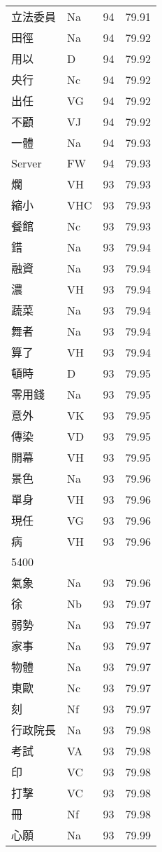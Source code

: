 \documentclass[twocolumn]{book}
\begin{document}
\begin{supertabular}{llrr}
立法委員 & Na & 94 &  79.91\\
田徑 & Na & 94 &  79.92\\
用以 & D & 94 &  79.92\\
央行 & Nc & 94 &  79.92\\
出任 & VG & 94 &  79.92\\
不顧 & VJ & 94 &  79.92\\
一體 & Na & 94 &  79.93\\
Server & FW & 94 &  79.93\\
爛 & VH & 93 &  79.93\\
縮小 & VHC & 93 &  79.93\\
餐館 & Nc & 93 &  79.93\\
錯 & Na & 93 &  79.94\\
融資 & Na & 93 &  79.94\\
濃 & VH & 93 &  79.94\\
蔬菜 & Na & 93 &  79.94\\
舞者 & Na & 93 &  79.94\\
算了 & VH & 93 &  79.94\\
頓時 & D & 93 &  79.95\\
零用錢 & Na & 93 &  79.95\\
意外 & VK & 93 &  79.95\\
傳染 & VD & 93 &  79.95\\
開幕 & VH & 93 &  79.95\\
景色 & Na & 93 &  79.96\\
單身 & VH & 93 &  79.96\\
現任 & VG & 93 &  79.96\\
病 & VH & 93 &  79.96\\
5400\\
氣象 & Na & 93 &  79.96\\
徐 & Nb & 93 &  79.97\\
弱勢 & Na & 93 &  79.97\\
家事 & Na & 93 &  79.97\\
物體 & Na & 93 &  79.97\\
東歐 & Nc & 93 &  79.97\\
刻 & Nf & 93 &  79.97\\
行政院長 & Na & 93 &  79.98\\
考試 & VA & 93 &  79.98\\
印 & VC & 93 &  79.98\\
打擊 & VC & 93 &  79.98\\
冊 & Nf & 93 &  79.98\\
心願 & Na & 93 &  79.99\\

\end{supertabular}
\end{document}
